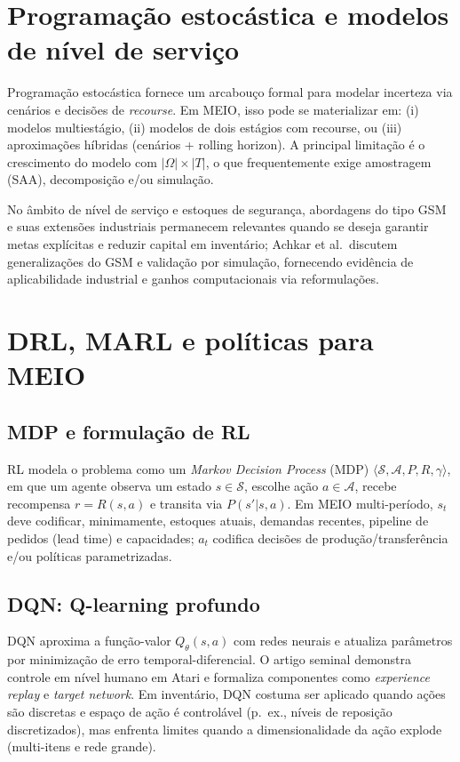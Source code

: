 \section{Programação estocástica e modelos de nível de serviço}

Programação estocástica fornece um arcabouço formal para modelar incerteza via cenários e decisões de \emph{recourse}. \cite{BirgeLouveaux2011StochasticProgramming} Em MEIO, isso pode se materializar em: (i) modelos multiestágio, (ii) modelos de dois estágios com recourse, ou (iii) aproximações híbridas (cenários + rolling horizon). A principal limitação é o crescimento do modelo com \(|\Omega|\times |T|\), o que frequentemente exige amostragem (SAA), decomposição e/ou simulação.

No âmbito de nível de serviço e estoques de segurança, abordagens do tipo GSM e suas extensões industriais permanecem relevantes quando se deseja garantir metas explícitas e reduzir capital em inventário; Achkar et al.\ discutem generalizações do GSM e validação por simulação, fornecendo evidência de aplicabilidade industrial e ganhos computacionais via reformulações. \cite{Achkar2024GSMExtensions}

\section{DRL, MARL e políticas para MEIO}

\subsection{MDP e formulação de RL}

RL modela o problema como um \emph{Markov Decision Process} (MDP) \(\langle \mathcal{S},\mathcal{A},P,R,\gamma\rangle\), em que um agente observa um estado \(s\in\mathcal{S}\), escolhe ação \(a\in\mathcal{A}\), recebe recompensa \(r=R(s,a)\) e transita via \(P(s'|s,a)\). \cite{SuttonBarto2018RL} Em MEIO multi-período, \(s_t\) deve codificar, minimamente, estoques atuais, demandas recentes, pipeline de pedidos (lead time) e capacidades; \(a_t\) codifica decisões de produção/transferência e/ou políticas parametrizadas.

\subsection{DQN: Q-learning profundo}

DQN aproxima a função-valor \(Q_\theta(s,a)\) com redes neurais e atualiza parâmetros por minimização de erro temporal-diferencial. O artigo seminal demonstra controle em nível humano em Atari e formaliza componentes como \emph{experience replay} e \emph{target network}. \cite{Mnih2015DQN} Em inventário, DQN costuma ser aplicado quando ações são discretas e espaço de ação é controlável (p.\ ex., níveis de reposição discretizados), mas enfrenta limites quando a dimensionalidade da ação explode (multi-itens e rede grande).

